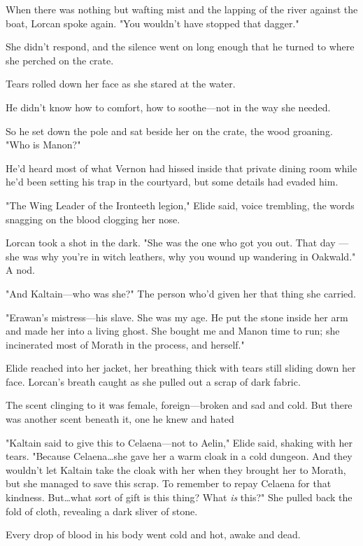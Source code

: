 When there was nothing but wafting mist and the lapping of the river against the boat, Lorcan spoke again.
"You wouldn't have stopped that dagger."

She didn't respond, and the silence went on long enough that he turned to where she perched on the crate.

Tears rolled down her face as she stared at the water.

He didn't know how to comfort, how to soothe---not in the way she needed.

So he set down the pole and sat beside her on the crate, the wood groaning.
"Who is Manon?"

He'd heard most of what Vernon had hissed inside that private dining room while he'd been setting his trap in the courtyard, but some details had evaded him.

"The Wing Leader of the Ironteeth legion," Elide said, voice trembling, the words snagging on the blood clogging her nose.

Lorcan took a shot in the dark.
"She was the one who got you out.
That day ---she was why you're in witch leathers, why you wound up wandering in Oakwald."
A nod.

"And Kaltain---who was she?"
The person who'd given her that thing she carried.

"Erawan's mistress---his slave.
She was my age.
He put the stone inside her arm and made her into a living ghost.
She bought me and Manon time to run; she incinerated most of Morath in the process, and herself."

Elide reached into her jacket, her breathing thick with tears still sliding down her face.
Lorcan's breath caught as she pulled out a scrap of dark fabric.

The scent clinging to it was female, foreign---broken and sad and cold.
But there was another scent beneath it, one he knew and hated 

"Kaltain said to give this to Celaena---not to Aelin," Elide said, shaking with her tears.
"Because Celaena\ldots she gave her a warm cloak in a cold dungeon.
And they wouldn't let Kaltain take the cloak with her when they brought her to Morath, but she managed to save this scrap.
To remember to repay Celaena for that kindness.
But\ldots what sort of gift is this thing?
What \emph{is} this?"
She pulled back the fold of cloth, revealing a dark sliver of stone.

Every drop of blood in his body went cold and hot, awake and dead.

